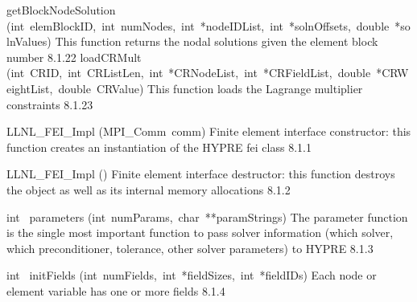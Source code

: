 \documentclass{article}
\begin{document}
\begin{cxxentry}
\begin{cxxentry}
\begin{cxxnames}
        {getBlockNodeSolution}
        {(int\ elemBlockID,\ int\ numNodes,\ int\ *nodeIDList,\ int\ *solnOffsets,\ double\ *solnValues)}
        {
This function returns the nodal solutions given the element block number}
        {8.1.22}
        {loadCRMult}
        {(int\ CRID,\ int\ CRListLen,\ int\ *CRNodeList,\ int\ *CRFieldList,\ double\ *CRWeightList,\ double\ CRValue)}
        {
This function loads the Lagrange multiplier constraints
}
        {8.1.23}
\end{cxxnames}
\begin{cxxfunction}
{}
        {LLNL\_FEI\_Impl}
        {(MPI\_Comm\ comm)}
        {
Finite element interface constructor: this function creates an
instantiation of the HYPRE fei class}
        {8.1.1}
\begin{cxxdoc}

\end{cxxdoc}
\end{cxxfunction}
\begin{cxxfunction}
{}
        {\cxxtilde LLNL\_FEI\_Impl}
        {()}
        {
Finite element interface destructor: this function destroys
the object as well as its internal memory allocations}
        {8.1.2}
\begin{cxxdoc}

\end{cxxdoc}
\end{cxxfunction}
\begin{cxxfunction}
{int\ }
        {parameters}
        {(int\ numParams,\ char\ **paramStrings)}
        {
The parameter function is the single most important function
to pass solver information (which solver, which preconditioner,
tolerance, other solver parameters) to HYPRE}
        {8.1.3}
\begin{cxxdoc}

\end{cxxdoc}
\end{cxxfunction}
\begin{cxxfunction}
{int\ }
        {initFields}
        {(int\ numFields,\ int\ *fieldSizes,\ int\ *fieldIDs)}
        {
Each node or element variable has one or more fields}
        {8.1.4}
\begin{cxxdoc}


\end{cxxdoc}
\end{cxxfunction}
\end{cxxentry}
\end{cxxentry}
\end{document}
